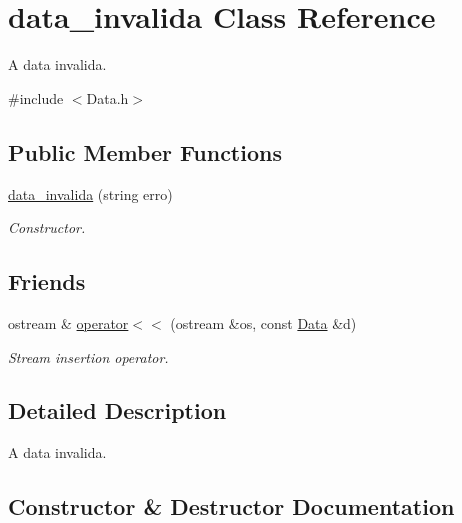 \hypertarget{classdata__invalida}{}\section{data\+\_\+invalida Class Reference}
\label{classdata__invalida}


A data invalida.  




{\ttfamily \#include $<$Data.\+h$>$}

\subsection*{Public Member Functions}
\begin{DoxyCompactItemize}
\item 
\hyperlink{classdata__invalida_a070558ee747109d2de521bacaa258046}{data\+\_\+invalida} (string erro)
\begin{DoxyCompactList}\small\item\em Constructor. \end{DoxyCompactList}\end{DoxyCompactItemize}
\subsection*{Friends}
\begin{DoxyCompactItemize}
\item 
ostream \& \hyperlink{classdata__invalida_a610a7c48e852afcc4874e1d5f0ed8f96}{operator$<$$<$} (ostream \&os, const \hyperlink{class_data}{Data} \&d)
\begin{DoxyCompactList}\small\item\em Stream insertion operator. \end{DoxyCompactList}\end{DoxyCompactItemize}


\subsection{Detailed Description}
A data invalida. 

\subsection{Constructor \& Destructor Documentation}
\hypertarget{classdata__invalida_a070558ee747109d2de521bacaa258046}{}\label{classdata__invalida_a070558ee747109d2de521bacaa258046} 

